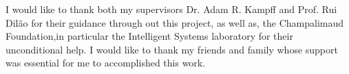 \begin{acknowledgments} 
I would like to thank both my supervisors Dr. Adam R. Kampff and Prof. Rui Dilão for their guidance through out this project, as well as, the Champalimaud Foundation,in particular the Intelligent Systems laboratory for their unconditional help. I would like to thank my friends and family whose support was essential for me to accomplished this work.
\end{acknowledgments}
\clearpage
\thispagestyle{empty}
\cleardoublepage
